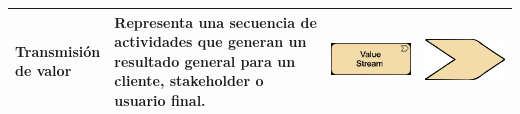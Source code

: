 \begin{longtable}{|p{0.15\linewidth}|p{0.45\linewidth}|p{0.2\linewidth} p{0.2\linewidth}|}
    Transmisión de valor  
    &
    Representa una secuencia de actividades que generan un resultado general para un cliente, stakeholder o usuario final. 
    &
\begin{center}
    \includegraphics[width=1\linewidth]{imgs/capa_estrategia/fig-Value-Stream-Notation_1.pdf}
\end{center} &
\begin{center}
    \includegraphics[width=0.5\linewidth]{imgs/capa_estrategia/fig-Value-Stream-Notation_2.pdf}
\end{center}
    \\ \hline




\end{longtable}
